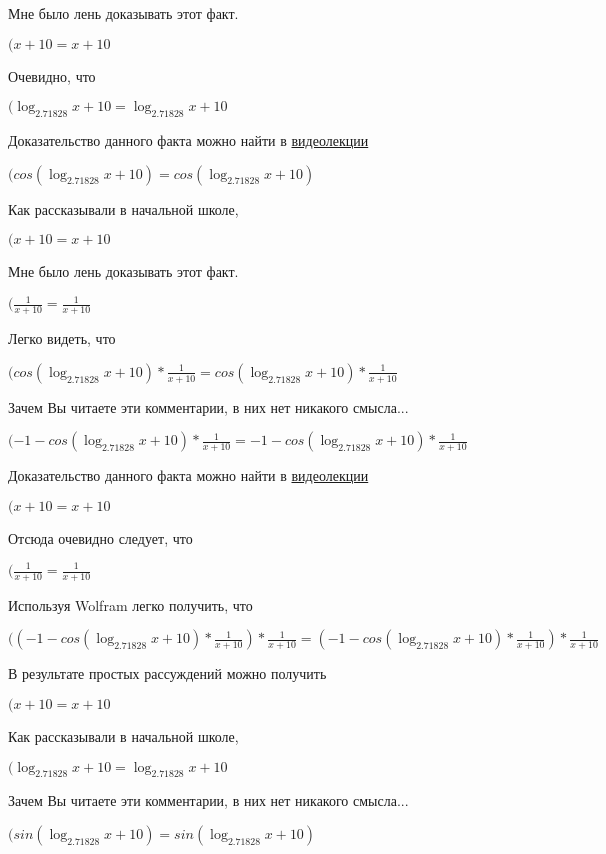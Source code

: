 \documentclass[12pt,a4paper,fleqn]{article}
\theoremstyle{definition}
\begin{document}
Мне было лень доказывать этот факт.

$( x  +  10  =  x  +  10 $

Очевидно, что

$(\log_{ 2.71828 }{ x  +  10 } = \log_{ 2.71828 }{ x  +  10 }$

Доказательство данного факта можно найти в \href{https://www.youtube.com/watch?v=dQw4w9WgXcQ}{видеолекции}

$(cos(\log_{ 2.71828 }{ x  +  10 }) = cos(\log_{ 2.71828 }{ x  +  10 })$

Как рассказывали в начальной школе,

$( x  +  10  =  x  +  10 $

Мне было лень доказывать этот факт.

$(\frac{ 1 }{ x  +  10 }
 = \frac{ 1 }{ x  +  10 }
$

Легко видеть, что

$(cos(\log_{ 2.71828 }{ x  +  10 }) * \frac{ 1 }{ x  +  10 }
 = cos(\log_{ 2.71828 }{ x  +  10 }) * \frac{ 1 }{ x  +  10 }
$

Зачем Вы читаете эти комментарии, в них нет никакого смысла...

$( -1  - cos(\log_{ 2.71828 }{ x  +  10 }) * \frac{ 1 }{ x  +  10 }
 =  -1  - cos(\log_{ 2.71828 }{ x  +  10 }) * \frac{ 1 }{ x  +  10 }
$

Доказательство данного факта можно найти в \href{https://www.youtube.com/watch?v=dQw4w9WgXcQ}{видеолекции}

$( x  +  10  =  x  +  10 $

Отсюда очевидно следует, что

$(\frac{ 1 }{ x  +  10 }
 = \frac{ 1 }{ x  +  10 }
$

Используя Wolfram легко получить, что

$(( -1  - cos(\log_{ 2.71828 }{ x  +  10 }) * \frac{ 1 }{ x  +  10 }
) * \frac{ 1 }{ x  +  10 }
 = ( -1  - cos(\log_{ 2.71828 }{ x  +  10 }) * \frac{ 1 }{ x  +  10 }
) * \frac{ 1 }{ x  +  10 }
$

В результате простых рассуждений можно получить

$( x  +  10  =  x  +  10 $

Как рассказывали в начальной школе,

$(\log_{ 2.71828 }{ x  +  10 } = \log_{ 2.71828 }{ x  +  10 }$

Зачем Вы читаете эти комментарии, в них нет никакого смысла...

$(sin(\log_{ 2.71828 }{ x  +  10 }) = sin(\log_{ 2.71828 }{ x  +  10 })$
\end{document}
